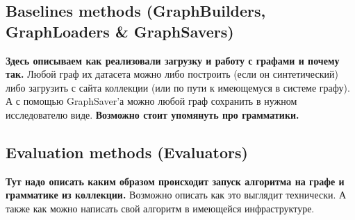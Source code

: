\subsection{Baselines methods (GraphBuilders, GraphLoaders & GraphSavers)}
\textbf{Здесь описываем как реализовали загрузку и работу с графами и почему так.}
Любой граф их датасета можно либо построить (если он синтетический) либо загрузить с сайта коллекции (или по пути к имеющемуся в системе графу).
А с помощью GraphSaver'а можно любой граф сохранить в нужном исследователю виде.
\textbf{Возможно стоит упомянуть про грамматики.}

\subsection{Evaluation methods (Evaluators)}
\textbf{Тут надо описать каким образом происходит запуск алгоритма на графе и грамматике из коллекции.}
Возможно описать как это выглядит технически.
А также как можно написать свой алгоритм в имеющейся инфраструктуре.
